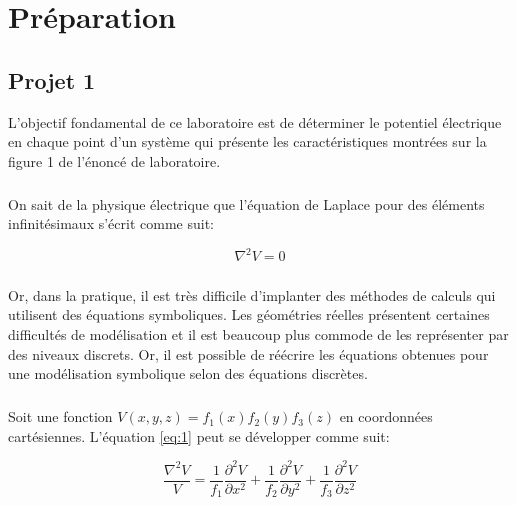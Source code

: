 


\chapter{Préparation}
\label{s:experimentation}
\section{Projet 1}

L'objectif fondamental de ce laboratoire est de déterminer le potentiel électrique en chaque point d'un système qui présente les caractéristiques montrées sur la figure 1 de l'énoncé de laboratoire. 

\paragraph{} On sait de la physique électrique que l'équation de Laplace pour des éléments infinitésimaux s'écrit comme suit:

\begin{equation}
\label{eq:1}
\nabla ^2 V = 0
\end{equation}

\paragraph{}Or, dans la pratique, il est très difficile d'implanter des méthodes de calculs qui utilisent des équations symboliques. Les géométries réelles présentent certaines difficultés de modélisation et il est beaucoup plus commode de les représenter par des niveaux discrets. Or, il est possible de réécrire les équations obtenues pour une modélisation symbolique selon des équations discrètes. 

\paragraph{}Soit une fonction $V(x,y,z) = f_1(x)f_2(y)f_3(z) $ en coordonnées cartésiennes. L'équation \ref{eq:1} peut se développer comme suit:

\begin{equation}
\frac{\nabla ^2 V}{V} = \frac{1}{f_1}\frac{\partial^2 V}{\partial x^2} + \frac{1}{f_2}\frac{\partial^2 V}{\partial y^2} + \frac{1}{f_3}\frac{\partial^2 V}{\partial z^2}
\end{equation}

